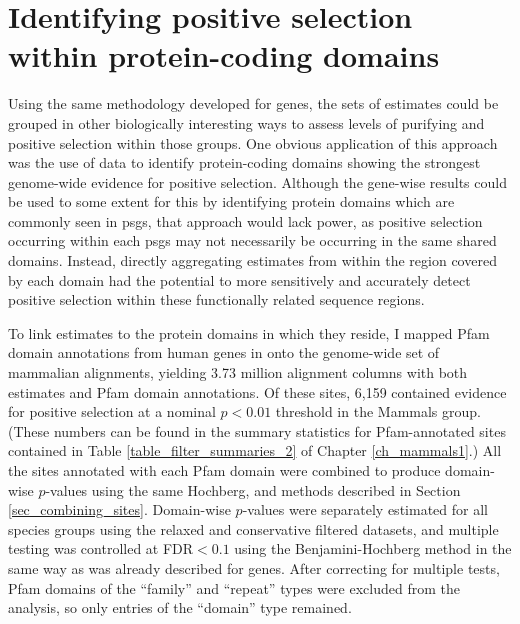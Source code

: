 \section{Identifying positive selection within protein-coding domains}

Using the same methodology developed for genes, the sets of \sw
estimates could be grouped in other biologically interesting ways to
assess levels of purifying and positive selection within those
groups. One obvious application of this approach was the use of \sw
data to identify protein-coding domains showing the strongest
genome-wide evidence for positive selection. Although the gene-wise
results could be used to some extent for this by identifying protein
domains which are commonly seen in \acp{psg}, that approach would lack
power, as positive selection occurring within each \acp{psg} may not
necessarily be occurring in the same shared domains. Instead, directly
aggregating \sw estimates from within the region covered by each
domain had the potential to more sensitively and accurately detect
positive selection within these functionally related sequence regions.

To link \sw estimates to the protein domains in which they reside, I
mapped Pfam domain annotations from human genes in \ens onto the
genome-wide set of mammalian alignments, yielding 3.73 million
alignment columns with both \sw estimates and Pfam domain
annotations. Of these sites, 6,159 contained evidence for positive
selection at a nominal $p<0.01$ threshold in the Mammals group. (These
numbers can be found in the summary statistics for Pfam-annotated
sites contained in Table \ref{table_filter_summaries_2} of Chapter
\ref{ch_mammals1}.) All the sites annotated with each Pfam domain were
combined to produce domain-wise $p$-values using the same Hochberg,
\psgefive and \psgeone methods described in Section
\ref{sec_combining_sites}. Domain-wise $p$-values were separately
estimated for all species groups using the relaxed and conservative
\sw filtered datasets, and multiple testing was controlled at
FDR$<0.1$ using the Benjamini-Hochberg method in the same way as was
already described for genes. After correcting for multiple tests, Pfam
domains of the ``family'' and ``repeat'' types were excluded from the
analysis, so only entries of the ``domain'' type remained.

